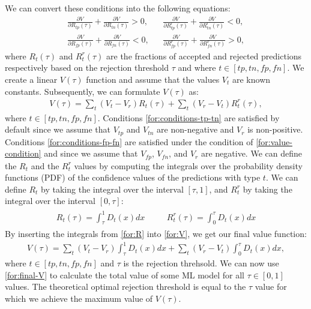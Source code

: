 % 
We can convert these conditions into the following equations:
\begin{subequations}
    \label{for:conditions}
    \begin{align}
        \frac{\partial V}{\partial R_{tp}(\tau)} + \frac{\partial V}{\partial R_{tn}(\tau)} > 0, &  &
        \frac{\partial V}{\partial R^r_{tp}(\tau)} + \frac{\partial V}{\partial R^r_{tn}(\tau)} < 0, \label{for:conditions-tp-tn} \\
        \frac{\partial V}{\partial R_{fp}(\tau)} + \frac{\partial V}{\partial R_{fn}(\tau)} < 0, &  &
        \frac{\partial V}{\partial R^r_{fp}(\tau)} + \frac{\partial V}{\partial R^r_{fn}(\tau)} > 0, \label{for:conditions-fp-fn}
    \end{align}
\end{subequations}
%
where $R_t(\tau)$ and $R_t^r(\tau)$ are the fractions of accepted and rejected predictions respectively based on the rejection threshold $\tau$ and where $t \in [tp, tn, fp, fn]$.
%
We create a linear $V(\tau)$ function and assume that the values $V_t$ are known constants.
%
Subsequently, we can formulate $V(\tau)$ as:
\begin{align}
    \label{for:V}
    V(\tau) = \sum_{t} (V_t - V_r)R_t(\tau) + \sum_{t} (V_r - V_t)R^r_{t}(\tau),
\end{align}
%
where $t \in [tp, tn, fp, fn]$.
%
Conditions \ref{for:conditions-tp-tn} are satisfied by default since we assume that $V_{tp}$ and $V_{tn}$ are non-negative and $V_r$ is non-positive.
%
Conditions \ref{for:conditions-fp-fn} are satisfied under the condition of \ref{for:value-condition} and since we assume that $V_{fp}$, $V_{fn}$, and $V_r$ are negative.
% 
We can define the $R_t$ and the $R_t^r$ values by computing the integrals over the probability density functions (PDF) of the confidence values of the predictions with type $t$.
%
We can define $R_t$ by taking the integral over the interval $[\tau, 1]$, and $R_t^r$ by taking the integral over the interval $[0, \tau]$:
%
\begin{align}
    \label{for:R}
    \begin{aligned}
        R_{t}(\tau) = \int_\tau^1 D_{t}(x)dx & \quad & R_{t}^r(\tau) = \int_0^\tau D_{t}(x)dx
    \end{aligned}
\end{align}
%
By inserting the integrals from \ref{for:R} into \ref{for:V}, we get our final value function:
%
\begin{align}
    \label{for:final-V}
    V(\tau) = \sum_{t} (V_t - V_r)\int_\tau^1 D_{t}(x)dx + \sum_{t} (V_r - V_t)\int_0^\tau D_{t}(x)dx,
\end{align}
%
where $t \in [tp, tn, fp, fn]$ and $\tau$ is the rejection threhsold.
%
We can now use \ref{for:final-V} to calculate the total value of some ML model for all $\tau \in [0, 1]$ values.
%
The theoretical optimal rejection threshold is equal to the $\tau$ value for which we achieve the maximum value of $V(\tau)$.


